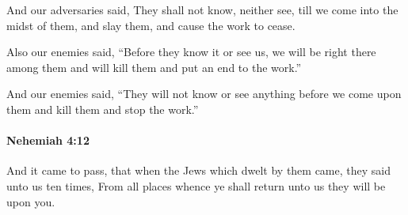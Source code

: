 			\begin{versebox}
					\item[BHS] 
					\item[LXX] 
					\item[ASV] And our adversaries said, They shall not know, neither see, till we come into the midst of them, and slay them, and cause the work to cease.
					\item[NIV] Also our enemies said, “Before they know it or see us, we will be right there among them and will kill them and put an end to the work.”
					\item[NRSV] And our enemies said, “They will not know or see anything before we come upon them and kill them and stop the work.”
			\end{versebox}

		\paragraph{Nehemiah 4:12} %
			\label{NEHEMIAH-4-12}

			And it came to pass, that when the Jews which dwelt by them came, they said unto us ten times, From all places whence ye shall return unto us they will be upon you.

